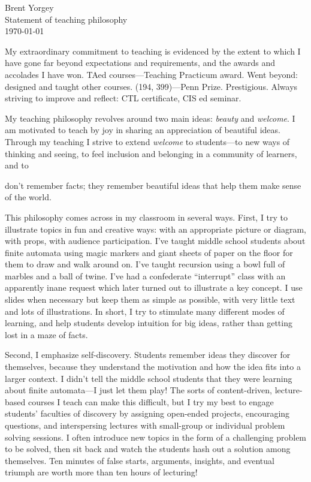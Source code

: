 \documentclass{article}
\begin{document}
\noindent Brent Yorgey \\
Statement of teaching philosophy \\
\today
\bigskip

My extraordinary commitment to teaching is evidenced by the extent to
which I have gone far beyond expectations and requirements, and the
awards and accolades I have won.  TAed courses---Teaching Practicum
award.  Went beyond: designed and taught other courses. (194,
399)---Penn Prize.  Prestigious.  Always striving to improve and
reflect: CTL certificate, CIS ed seminar.


My teaching philosophy revolves around two main ideas: \emph{beauty}
and \emph{welcome}.  I am motivated to teach by joy in sharing an
appreciation of beautiful ideas.  Through my teaching I strive to
extend \emph{welcome} to students---to new ways of thinking and
seeing, to feel inclusion and belonging in a community of learners,
and to

  don't remember facts; they remember beautiful
ideas that help them make sense of the world.

This philosophy comes across in my classroom in several ways. First, I
try to illustrate topics in fun and creative ways: with an appropriate
picture or diagram, with props, with audience participation.  I've
taught middle school students about finite automata using magic
markers and giant sheets of paper on the floor for them to draw and
walk around on.  I've taught recursion using a bowl full of marbles
and a ball of twine.  I've had a confederate ``interrupt'' class with
an apparently inane request which later turned out to illustrate a key
concept.  I use slides when necessary but keep them as simple as
possible, with very little text and lots of illustrations.  In short,
I try to stimulate many different modes of learning, and help students
develop intuition for big ideas, rather than getting lost in a maze of
facts.

Second, I emphasize self-discovery. Students remember ideas they
discover for themselves, because they understand the motivation and
how the idea fits into a larger context. I didn't tell the middle
school students that they were learning about finite automata---I just
let them play! The sorts of content-driven, lecture-based courses I
teach can make this difficult, but I try my best to engage students'
faculties of discovery by assigning open-ended projects, encouraging
questions, and interspersing lectures with small-group or individual
problem solving sessions.  I often introduce new topics in the form of
a challenging problem to be solved, then sit back and watch the
students hash out a solution among themselves.  Ten minutes of false
starts, arguments, insights, and eventual triumph are worth more than
ten hours of lecturing!
\end{document}
